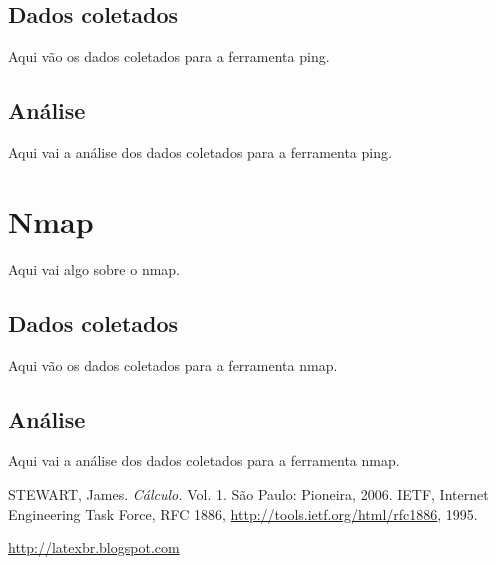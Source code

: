 \documentclass[a4paper]{report} %
\begin{document}
\subsection{Dados coletados}
\label{sub_ping_dados}
Aqui vão os dados coletados para a ferramenta ping.

\subsection{Análise}
\label{sub_ping_analise}
Aqui vai a análise dos dados coletados para a ferramenta ping.

\section{Nmap}
\label{sec_nmap}
Aqui vai algo sobre o nmap.
\subsection{Dados coletados}
\label{sub_nmap_dados}
Aqui vão os dados coletados para a ferramenta nmap.

\subsection{Análise}
\label{sub_nmap_analise}
Aqui vai a análise dos dados coletados para a ferramenta nmap.

\begin{thebibliography}{99}
 STEWART, James. {\sl C\'alculo.} Vol. 1. S\~ao Paulo: Pioneira, 2006.
 IETF, Internet Engineering Task Force, RFC 1886, \url{http://tools.ietf.org/html/rfc1886}, 1995.

\url{http://latexbr.blogspot.com}
\end{thebibliography}

\end{document}
